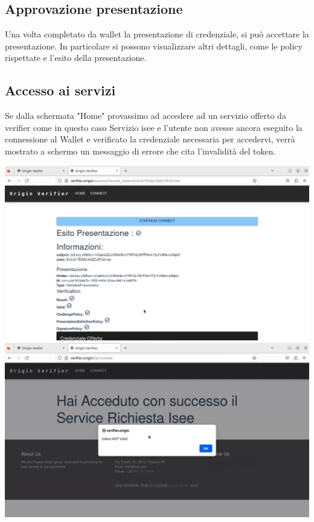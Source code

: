 \subsection{Approvazione presentazione}
Una volta completato da wallet la presentazione di credenziale, si può accettare la presentazione. In particolare si possono visualizzare altri dettagli, come le policy rispettate e l'esito della presentazione.

\subsection{Accesso ai servizi}
Se dalla schermata "Home" provassimo ad accedere ad un servizio offerto da verifier come in questo caso Servizio isee e l'utente non avesse ancora eseguito la connessione al Wallet e verificato la credenziale necessaria per accedervi, verrà mostrato a schermo un messaggio di errore che cita l'invalidità del token.

\begin{center}
    \includegraphics[scale = 0.2]{./res/img/verifier/new/verifier_after_presentation.png}
    \includegraphics[scale = 0.2]{./res/img/verifier/new/verifier_token_not_valid.png}
\end{center}

